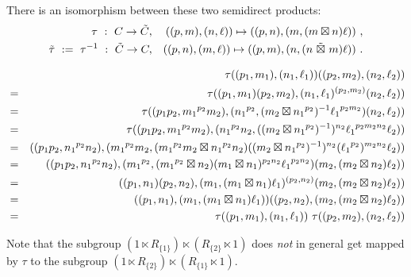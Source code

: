 \begin{prop} \label{prop:tau}
There is an isomorphism between these two semidirect products: 
\begin{eqnarray}
\label{eq:cat1-iso}
\tau ~:~ C \to \tilde{C}, &&
((p,m),(n,\ell)) \mapsto ((p,n),(m,(m \boxtimes n)\ell))~, \\
\nonumber
\tilde{\tau} ~:=~ \tau^{-1} ~:~ \tilde{C} \to C, &&
((p,n),(m,\ell)) \mapsto ((p,m),(n,(n \ \tilde{\boxtimes}\  m) \ell))~.
\end{eqnarray}
\end{prop}
\begin{pf}
\vspace{-6mm}
\begin{eqnarray*}
 &   &  \tau((p_1,m_1),(n_1,\ell_1))((p_2,m_2),(n_2,\ell_2)) \\
 & = &  \tau((p_1,m_1)(p_2,m_2),
                  (n_1,\ell_1)^{(p_2,m_2)}(n_2,\ell_2)) \\
 & = &  \tau((p_1p_2,{m_1}^{p_2}m_2),
    ({n_1}^{p_2},(m_2 \bt {n_1}^{p_2})^{-1} {\ell_1}^{p_2m_2})(n_2,\ell_2)) \\
 & = &  \tau((p_1p_2,{m_1}^{p_2}m_2),
                  ({n_1}^{p_2}n_2,((m_2 \bt {n_1}^{p_2})^{-1})^{n_2} 
                    {\ell_1}^{p_2m_2n_2} \ell_2)) \\
 & = &  ((p_1p_2,{n_1}^{p_2}n_2),
         ({m_1}^{p_2}m_2,({m_1}^{p_2}m_2 \bt {n_1}^{p_2}n_2)
          ((m_2 \bt {n_1}^{p_2})^{-1})^{n_2}
           ({\ell_1}^{p_2})^{m_2n_2} \ell_2)) \\
 & = &  ((p_1p_2,{n_1}^{p_2}n_2), ({m_1}^{p_2},({m_1}^{p_2} \bt n_2)
          (m_1 \bt n_1)^{p_2n_2} {\ell_1}^{p_2n_2})
           (m_2,(m_2 \bt n_2)\ell_2)) \\
 & = &  ((p_1,n_1)(p_2,n_2), (m_1,(m_1 \bt n_1)\ell_1)^{(p_2,n_2)}
           (m_2,(m_2 \bt n_2)\ell_2)) \\
 & = &  ((p_1,n_1),(m_1,(m_1 \bt n_1)\ell_1))
          ((p_2,n_2),(m_2,(m_2 \bt n_2)\ell_2)) \\
 & = &  \tau((p_1,m_1),(n_1,\ell_1))\ \tau((p_2,m_2),(n_2,\ell_2))
\end{eqnarray*}
\end{pf}

\noindent
Note that the subgroup 
$(1 \ltimes R_{\{1\}}) \ltimes (R_{\{2\}} \ltimes 1)$
does \emph{not} in general get mapped by $\tau$ to the subgroup 
$(1 \ltimes R_{\{2\}}) \ltimes (R_{\{1\}} \ltimes 1)$. 


